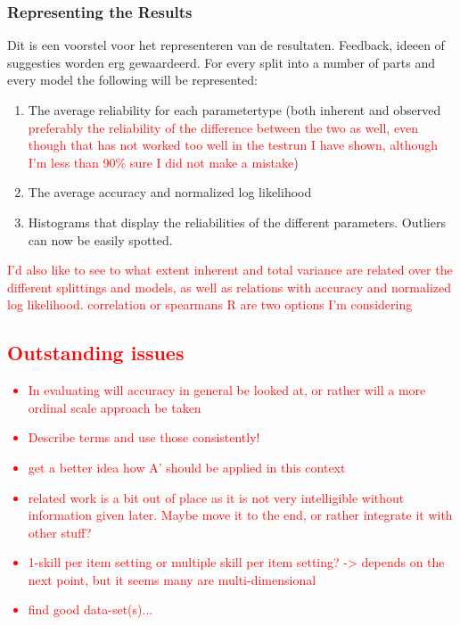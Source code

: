\documentclass{scrartcl}
\newcommand\todo[1]{\textcolor{red}{#1}}
\begin{document}
\subsubsection{Representing the Results}
Dit is een voorstel voor het representeren van de resultaten. Feedback, ideeen of suggesties worden erg gewaardeerd.
For every split into a number of parts and every model the following will be represented:
\begin{enumerate}
\item The average reliability for each parametertype (both inherent and observed \todo{ preferably the reliability of the difference between the two as well, even though that has not worked too well in the testrun I have shown, although I'm less than 90\% sure I did not make a mistake})
\item The average accuracy and normalized log likelihood
\item Histograms that display the reliabilities of the different parameters. Outliers can now be easily spotted.
\end{enumerate}
\todo{I'd also like to see to what extent inherent and total variance are related over the different splittings and models, as well as relations with accuracy and normalized log likelihood. correlation or spearmans R are two options I'm considering}

\todo{
\section{Outstanding issues}
\begin{itemize}
\item In evaluating will accuracy in general be looked at, or rather will a more ordinal scale approach be taken
\item Describe terms and use those consistently!
\item get a better idea how A' should be applied in this context
\item related work is a bit out of place as it is not very intelligible without information given later. Maybe move it to the end, or rather integrate it with other stuff?
\item 1-skill per item setting or multiple skill per item setting? -> depends on the next point, but it seems many are multi-dimensional
\item find good data-set(s)...
\end{itemize}
}

\newpage
\appendix
\end{document}

